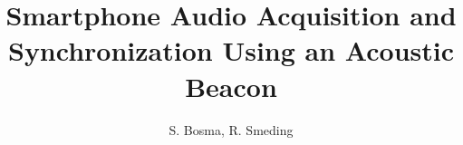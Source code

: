 \title{Smartphone Audio Acquisition and Synchronization Using an Acoustic Beacon}
\author{\sffamily\small S. Bosma, R. Smeding}
\date{}